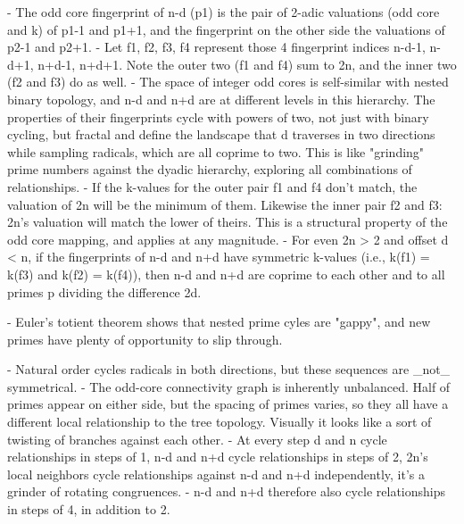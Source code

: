 \documentclass[12pt]{article}
\theoremstyle{plain}
\theoremstyle{definition}
\begin{document}
- The odd core fingerprint of n-d (p1) is the pair of 2-adic valuations (odd core and k) of p1-1 and p1+1, and the fingerprint on the other side the valuations of p2-1 and p2+1.
- Let f1, f2, f3, f4 represent those 4 fingerprint indices n-d-1, n-d+1, n+d-1, n+d+1. Note the outer two (f1 and f4) sum to 2n, and the inner two (f2 and f3) do as well.
- The space of integer odd cores is self-similar with nested binary topology, and n-d and n+d are at different levels in this hierarchy. The properties of their fingerprints cycle with powers of two, not just with binary cycling, but fractal  and define the landscape that d traverses in two directions while sampling radicals, which are all coprime to two. This is like "grinding" prime numbers against the dyadic hierarchy, exploring all combinations of relationships.
- If the k-values for the outer pair f1 and f4 don't match, the valuation of 2n will be the minimum of them. Likewise the inner pair f2 and f3: 2n's valuation will match the lower of theirs. This is a structural property of the odd core mapping, and applies at any magnitude. 
- For even 2n > 2 and offset d < n, if the fingerprints of n-d and n+d have symmetric k-values (i.e., k(f1) = k(f3) and k(f2) = k(f4)), then n-d and n+d are coprime to each other and to all primes p dividing the difference 2d.

- Euler's totient theorem shows that nested prime cyles are "gappy", and new primes have plenty of opportunity to slip through.


- Natural order cycles radicals in both directions, but these sequences are _not_ symmetrical.
- The odd-core connectivity graph is inherently unbalanced. Half of primes appear on either side, but the spacing of primes varies, so they all have a different local relationship to the tree topology. Visually it looks like a sort of twisting of branches against each other.
- At every step d and n cycle relationships in steps of 1, n-d and n+d cycle relationships in steps of 2, 2n's local neighbors cycle relationships against n-d and n+d independently, it's a grinder of rotating congruences.
- n-d and n+d therefore also cycle relationships in steps of 4, in addition to 2.
\end{document}
